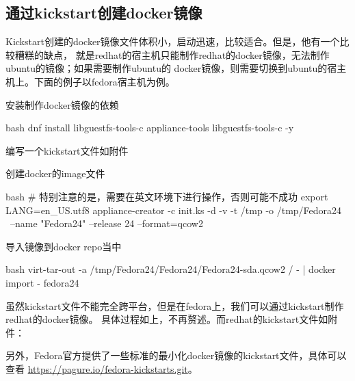 \subsection{通过kickstart创建docker镜像}
Kickstart创建的docker镜像文件体积小，启动迅速，比较适合。但是，他有一个比较糟糕的缺点，
就是redhat的宿主机只能制作redhat的docker镜像，无法制作ubuntu的镜像；如果需要制作ubuntu的
docker镜像，则需要切换到ubuntu的宿主机上。下面的例子以fedora宿主机为例。
\begin{outline}[enumerate]
  \1 安装制作docker镜像的依赖
\begin{code-block}{bash}
dnf install libguestfs-tools-c appliance-tools libguestfs-tools-c -y
\end{code-block}

  \1 编写一个kickstart文件如附件

  \1 创建docker的image文件
\begin{code-block}{bash}
# 特别注意的是，需要在英文环境下进行操作，否则可能不成功
export LANG=en_US.utf8
appliance-creator -c init.ks -d -v -t /tmp -o /tmp/Fedora24 \
      --name "Fedora24" --release 24 --format=qcow2
\end{code-block}

  \1 导入镜像到docker repo当中
\begin{code-block}{bash}
virt-tar-out -a /tmp/Fedora24/Fedora24/Fedora24-sda.qcow2 / - | docker import - fedora24
\end{code-block}
\end{outline}

虽然kickstart文件不能完全跨平台，但是在fedora上，我们可以通过kickstart制作redhat的docker镜像。
具体过程如上，不再赘述。而redhat的kickstart文件如附件：

另外，Fedora官方提供了一些标准的最小化docker镜像的kickstart文件，具体可以查看
\url{https://pagure.io/fedora-kickstarts.git}。

